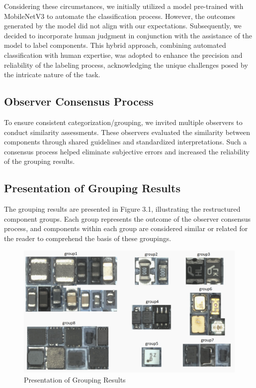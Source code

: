 Considering these circumstances, we initially utilized a model pre-trained with MobileNetV3\cite{mobilenetv3} to automate the classification process. However, the outcomes generated by the model did not align with our expectations. Subsequently, we decided to incorporate human judgment in conjunction with the assistance of the model to label components. This hybrid approach, combining automated classification with human expertise, was adopted to enhance the precision and reliability of the labeling process, acknowledging the unique challenges posed by the intricate nature of the task.

\subsection{Observer Consensus Process}
To ensure consistent categorization/grouping, we invited multiple observers to conduct similarity assessments. These observers evaluated the similarity between components through shared guidelines and standardized interpretations. Such a consensus process helped eliminate subjective errors and increased the reliability of the grouping results. 
\subsection{Presentation of Grouping Results}
The grouping results are presented in Figure 3.1, illustrating the restructured component groups. Each group represents the outcome of the observer consensus process, and components within each group are considered similar or related for the reader to comprehend the basis of these groupings. 
\begin{figure}[H]
    \centering
    \includegraphics[width=1\linewidth]{Regrouping.png}
    \caption{Presentation of Grouping Results}
    \label{fig:enter-label}
\end{figure}

